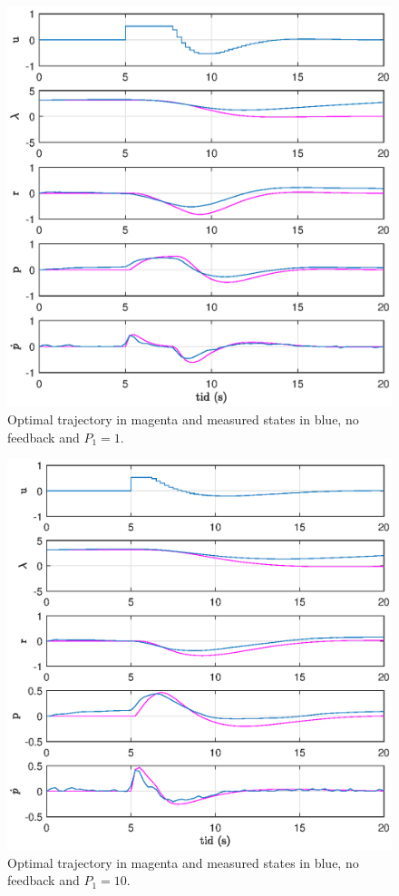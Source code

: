 \begin{figure}[h]
	\centering
	\includegraphics[width=\textwidth]{figures/plots/2_P1=1.eps}
	\caption{Optimal trajectory in magenta and measured states in blue, no feedback and $P_1=1$.}
\label{fig:2_p1=1}
\end{figure}

\begin{figure}[h]
	\centering
	\includegraphics[width=\textwidth]{figures/plots/2_P1=10.eps}
	\caption{Optimal trajectory in magenta and measured states in blue, no feedback and $P_1=10$.}
\label{fig:2_p1=10}
\end{figure}

